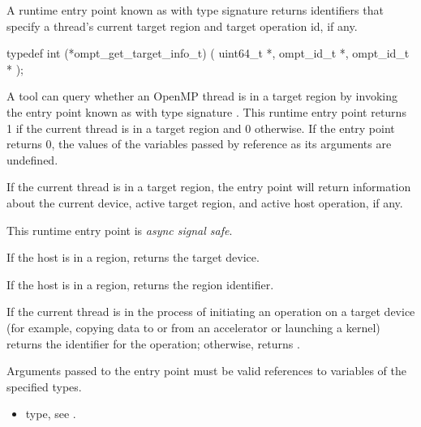 \summary
A runtime entry point known as 
with type signature  returns identifiers that specify a
thread's current target region and target operation id, if any.

\format
\begin{ccppspecific}
\begin{omptInquiry}
typedef int (*ompt_get_target_info_t) (
  uint64_t *,
  ompt_id_t *,
  ompt_id_t *
);
\end{omptInquiry}
\end{ccppspecific}

\descr
A tool can query whether an OpenMP thread is in a target region by
invoking the entry point known as 
with type signature .
This runtime entry point returns 1 if the current thread is
in a target region and 0 otherwise. If the entry point returns 0,
the values of the variables passed by reference as its arguments
are undefined.

If the current thread is in a target region, the entry point will
return information about the current device, active target region, and
active host operation, if any.

This runtime entry point is \emph{async signal safe}.

\argdesc

If the host is in a  region,
 returns the target device.

If the host is in a  region,
 returns the  region identifier.

If the current thread is in the process of initiating an
operation on a target device (for example, copying data to or from an
accelerator or launching a kernel)  returns
the identifier for the operation; otherwise,
 returns .

\constraints

Arguments passed to the entry point must be valid
references to variables of the specified types.

\crossreferences
\begin{itemize}
\item {} type, see .
\end{itemize}

\label{sec:ompt_get_num_devices_t}
\label{sec:ompt_get_num_devices}

